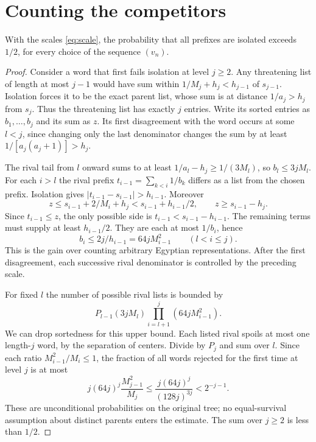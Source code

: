 \documentclass[11pt]{article}
\begin{document}
\section{Counting the competitors}\label{sec:count}
\begin{proposition}\label{prop:survive}
With the scales \eqref{eq:scale}, the probability that all prefixes are isolated exceeds $1/2$, for every choice of the sequence $(v_n)$.
\end{proposition}
\begin{proof}
Consider a word that first fails isolation at level $j\ge2$. Any threatening list of length at most $j-1$ would have sum within $1/M_j+h_j<h_{j-1}$ of $s_{j-1}$. Isolation forces it to be the exact parent list, whose sum is at distance $1/a_j>h_j$ from $s_j$. Thus the threatening list has exactly $j$ entries. Write its sorted entries as $b_1,\ldots,b_j$ and its sum as $z$. Its first disagreement with the word occurs at some $l<j$, since changing only the last denominator changes the sum by at least $1/[a_j(a_j+1)]>h_j$.

The rival tail from $l$ onward sums to at least $1/a_l-h_j\ge 1/(3M_l)$, so $b_l\le 3jM_l$. For each $i>l$ the rival prefix $t_{i-1}=\sum_{k<i}1/b_k$ differs as a list from the chosen prefix. Isolation gives $|t_{i-1}-s_{i-1}|>h_{i-1}$. Moreover
\[
 z\le s_{i-1}+2/M_i+h_j<s_{i-1}+h_{i-1}/2,
 \qquad z\ge s_{i-1}-h_j.
\]
Since $t_{i-1}\le z$, the only possible side is $t_{i-1}<s_{i-1}-h_{i-1}$. The remaining terms must supply at least $h_{i-1}/2$. They are each at most $1/b_i$, hence
\begin{equation}\label{eq:cost}
 b_i\le 2j/h_{i-1}=64jM_{i-1}^2\qquad(l<i\le j).
\end{equation}
This is the gain over counting arbitrary Egyptian representations. After the first disagreement, each successive rival denominator is controlled by the preceding scale.

For fixed $l$ the number of possible rival lists is bounded by
\[
 P_{l-1}(3jM_l)\prod_{i=l+1}^j(64jM_{i-1}^2).
\]
We can drop sortedness for this upper bound. Each listed rival spoils at most one length-$j$ word, by the separation of centers. Divide by $P_j$ and sum over $l$. Since each ratio $M_{i-1}^2/M_i\le1$, the fraction of all words rejected for the first time at level $j$ is at most
\begin{equation}\label{eq:bound}
 j(64j)^j\frac{M_{j-1}^2}{M_j}
 \le \frac{j(64j)^j}{(128j)^{3j}}<2^{-j-1}.
\end{equation}
These are unconditional probabilities on the original tree; no equal-survival assumption about distinct parents enters the estimate. The sum over $j\ge2$ is less than $1/2$.
\end{proof}
\end{document}
